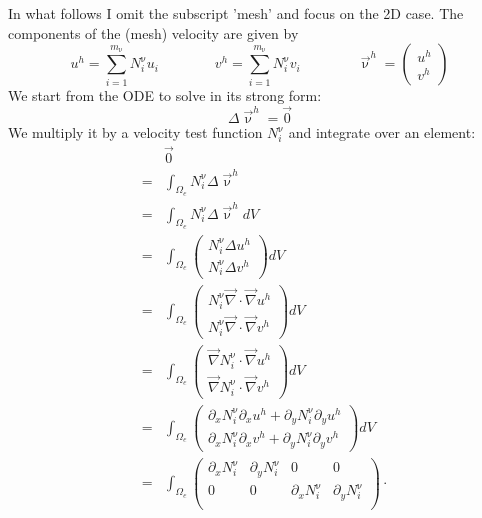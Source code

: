 In what follows I omit the subscript 'mesh' and focus on the 2D case. The components of the (mesh) velocity
are given by
\[
u^h = \sum_{i=1}^{m_\upnu} N_i^\upnu u_i
\qquad
\qquad
v^h = \sum_{i=1}^{m_\upnu} N_i^\upnu v_i
\qquad
\qquad
\vec{\upnu}^h=\left( 
\begin{array}{c}
u^h \\
v^h 
\end{array}  \right)
\]
We start from the ODE to solve in its strong form:
\[
\Delta \vec{\upnu}^h = \vec{0}
\]
We multiply it by a velocity test function $N_i^\upnu$ and integrate over an element: 
\begin{eqnarray}
&&\vec 0 \nonumber\\
&=& \int_{\Omega_e} N_i^\upnu  \Delta \vec{\upnu}^h \nonumber\\ 
&=&\int_{\Omega_e} N_i^\upnu \Delta \vec\upnu^h dV \nonumber\\
&=&\int_{\Omega_e}  \left(\begin{array}{c}
N_i^\upnu \Delta u^h \\
N_i^\upnu \Delta v^h 
\end{array}\right) dV \nonumber\\
&=&\int_{\Omega_e}  \left(\begin{array}{c}
N_i^\upnu \vec\nabla \cdot \vec\nabla u^h \\
N_i^\upnu \vec\nabla \cdot \vec\nabla v^h 
\end{array}\right) dV \nonumber\\
&=&
\int_{\Omega_e}   \left(\begin{array}{c}
\vec\nabla N_i^\upnu \cdot \vec\nabla u^h \\
\vec\nabla N_i^\upnu \cdot \vec\nabla v^h 
\end{array}\right) dV \nonumber\\
&=&
\int_{\Omega_e}
\left(\begin{array}{c}
\partial_x N_i^\upnu \partial_x u^h + \partial_y N_i^\upnu \partial_y u^h \\ 
\partial_x N_i^\upnu \partial_x v^h + \partial_y N_i^\upnu \partial_y v^h 
\end{array}\right) dV \nonumber\\
&=&\int_{\Omega_e}
\left(
\begin{array}{cccc}
\partial_x N_i^\upnu & \partial_y N_i^\upnu & 0 & 0 \\ 
0 & 0 & \partial_x N_i^\upnu & \partial_y N_i^\upnu  \\ 
\end{array}
\right)
\!\cdot\!

\end{eqnarray}
